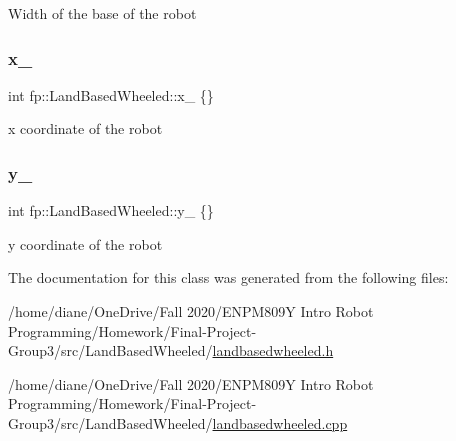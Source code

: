 Width of the base of the robot \mbox{\label{classfp_1_1_land_based_wheeled_a575a73a2601f480d2edbc5daa4cc5bf1}} 
\subsubsection{\texorpdfstring{x\+\_\+}{x\_}}
{\footnotesize\ttfamily int fp\+::\+Land\+Based\+Wheeled\+::x\+\_\+ \{\}\hspace{0.3cm}{\ttfamily [protected]}}

x coordinate of the robot \mbox{\label{classfp_1_1_land_based_wheeled_a5b66ada6988a2b8ce6efafa971dfd9c6}} 
\subsubsection{\texorpdfstring{y\+\_\+}{y\_}}
{\footnotesize\ttfamily int fp\+::\+Land\+Based\+Wheeled\+::y\+\_\+ \{\}\hspace{0.3cm}{\ttfamily [protected]}}

y coordinate of the robot 

The documentation for this class was generated from the following files\+:\begin{DoxyCompactItemize}
\item 
/home/diane/\+One\+Drive/\+Fall 2020/\+E\+N\+P\+M809\+Y Intro Robot Programming/\+Homework/\+Final-\/\+Project-\/\+Group3/src/\+Land\+Based\+Wheeled/\hyperlink{landbasedwheeled_8h}{landbasedwheeled.\+h}\item 
/home/diane/\+One\+Drive/\+Fall 2020/\+E\+N\+P\+M809\+Y Intro Robot Programming/\+Homework/\+Final-\/\+Project-\/\+Group3/src/\+Land\+Based\+Wheeled/\hyperlink{landbasedwheeled_8cpp}{landbasedwheeled.\+cpp}\end{DoxyCompactItemize}
